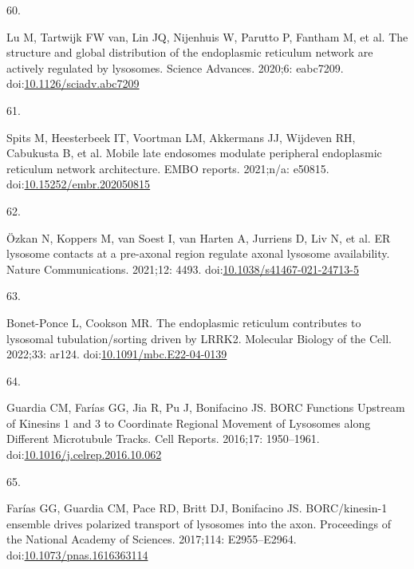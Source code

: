 \documentclass[
  12pt,
  a4paper,
]{book}
\newlength{\cslhangindent}
\newlength{\csllabelwidth}
\newlength{\cslentryspacingunit} %
\newenvironment{CSLReferences}[2] %
 {%
  \setlength{\parindent}{0pt}
  \ifodd #1
  \let\oldpar\par
  \def\par{\hangindent=\cslhangindent\oldpar}
  \fi
  \setlength{\parskip}{#2\cslentryspacingunit}
 }%
 {}
\newcommand{\CSLLeftMargin}[1]{\parbox[t]{\csllabelwidth}{#1}}
\newcommand{\CSLRightInline}[1]{\parbox[t]{\linewidth - \csllabelwidth}{#1}\break}
\begin{document}
\begin{CSLReferences}{0}{0}
\leavevmode{}%
\CSLLeftMargin{60. }%
\CSLRightInline{Lu M, Tartwijk FW van, Lin JQ, Nijenhuis W, Parutto P, Fantham M, et al. The structure and global distribution of the endoplasmic reticulum network are actively regulated by lysosomes. Science Advances. 2020;6: eabc7209. doi:\href{https://doi.org/10.1126/sciadv.abc7209}{10.1126/sciadv.abc7209}}

\leavevmode{}%
\CSLLeftMargin{61. }%
\CSLRightInline{Spits M, Heesterbeek IT, Voortman LM, Akkermans JJ, Wijdeven RH, Cabukusta B, et al. Mobile late endosomes modulate peripheral endoplasmic reticulum network architecture. EMBO reports. 2021;n/a: e50815. doi:\href{https://doi.org/10.15252/embr.202050815}{10.15252/embr.202050815}}

\leavevmode{}%
\CSLLeftMargin{62. }%
\CSLRightInline{Özkan N, Koppers M, van Soest I, van Harten A, Jurriens D, Liv N, et al. {ER} \textendash{} lysosome contacts at a pre-axonal region regulate axonal lysosome availability. Nature Communications. 2021;12: 4493. doi:\href{https://doi.org/10.1038/s41467-021-24713-5}{10.1038/s41467-021-24713-5}}

\leavevmode{}%
\CSLLeftMargin{63. }%
\CSLRightInline{Bonet-Ponce L, Cookson MR. The endoplasmic reticulum contributes to lysosomal tubulation/sorting driven by {LRRK2}. Molecular Biology of the Cell. 2022;33: ar124. doi:\href{https://doi.org/10.1091/mbc.E22-04-0139}{10.1091/mbc.E22-04-0139}}

\leavevmode{}%
\CSLLeftMargin{64. }%
\CSLRightInline{Guardia CM, Farías GG, Jia R, Pu J, Bonifacino JS. {BORC Functions Upstream} of {Kinesins} 1 and 3 to {Coordinate Regional Movement} of {Lysosomes} along {Different Microtubule Tracks}. Cell Reports. 2016;17: 1950--1961. doi:\href{https://doi.org/10.1016/j.celrep.2016.10.062}{10.1016/j.celrep.2016.10.062}}

\leavevmode{}%
\CSLLeftMargin{65. }%
\CSLRightInline{Farías GG, Guardia CM, Pace RD, Britt DJ, Bonifacino JS. {BORC}/kinesin-1 ensemble drives polarized transport of lysosomes into the axon. Proceedings of the National Academy of Sciences. 2017;114: E2955--E2964. doi:\href{https://doi.org/10.1073/pnas.1616363114}{10.1073/pnas.1616363114}}


\end{CSLReferences}
\end{document}
